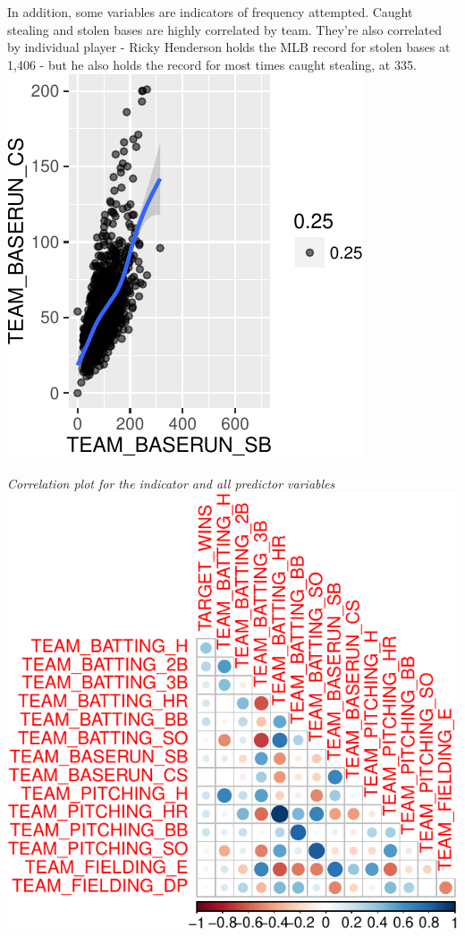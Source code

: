 \documentclass[]{article}
\begin{document}
In addition, some variables are indicators of frequency attempted.
Caught stealing and stolen bases are highly correlated by team. They're
also correlated by individual player - Ricky Henderson holds the MLB
record for stolen bases at 1,406 - but he also holds the record for most
times caught stealing, at 335.
\includegraphics{DATA621-Homework-1_files/figure-latex/unnamed-chunk-10-1.pdf}

\emph{Correlation plot for the indicator and all predictor variables}\\
\includegraphics{DATA621-Homework-1_files/figure-latex/unnamed-chunk-11-1.pdf}
\end{document}
